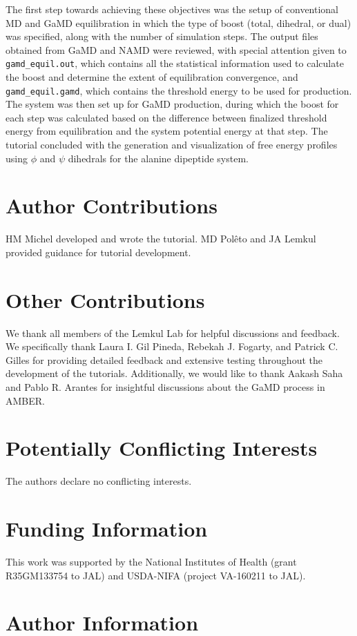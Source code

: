 \documentclass[9pt,tutorial,pubversion]{livecoms}
\begin{document}
The first step towards achieving these objectives was the setup of conventional MD and GaMD equilibration in which the type of boost (total, dihedral, or dual) was specified, along with the number of simulation steps. The output files obtained from GaMD and NAMD were reviewed, with special attention given to \texttt{gamd\_equil.out}, which contains all the statistical information used to calculate the boost and determine the extent of equilibration convergence, and \texttt{gamd\_equil.gamd}, which contains the threshold energy to be used for production. The system was then set up for GaMD production, during which the boost for each step was calculated based on the difference between finalized threshold energy from equilibration and the system potential energy at that step. The tutorial concluded with the generation and visualization of free energy profiles using $\phi$ and $\psi$ dihedrals for the alanine dipeptide system.


\section{Author Contributions}
HM Michel developed and wrote the tutorial. MD Polêto and JA Lemkul provided guidance for tutorial development. 

\section{Other Contributions}
We thank all members of the Lemkul Lab for helpful discussions and feedback. We specifically thank Laura I. Gil Pineda, Rebekah J. Fogarty, and Patrick C. Gilles for providing detailed feedback and extensive testing throughout the development of the tutorials. Additionally, we would like to thank Aakash Saha and Pablo R. Arantes for insightful discussions about the GaMD process in AMBER.

\section{Potentially Conflicting Interests}

The authors declare no conflicting interests.

\section{Funding Information}

This work was supported by the National Institutes of Health (grant R35GM133754 to JAL) and USDA-NIFA (project VA-160211 to JAL).

\section*{Author Information}
\makeorcid


\end{document}
